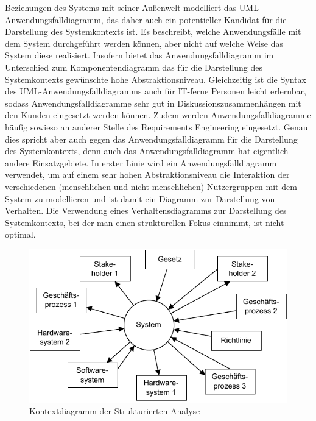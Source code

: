 Beziehungen des Systems mit seiner Außenwelt modelliert das UML-Anwen\-dungs\-fall\-diagramm, das daher auch ein potentieller Kandidat für die Darstellung des System\-kontexts ist.  Es beschreibt, welche Anwendungsfälle mit dem System durchgeführt werden können, aber nicht auf welche Weise das System diese realisiert. Insofern bietet das Anwendungsfalldiagramm im Unterschied zum Komponenten\-diagramm das für die Darstellung des Systemkontexts gewünschte hohe Abstraktions\-niveau. Gleichzeitig ist die Syntax des UML-Anwendungsfalldiagramms auch für 
\linebreak %
IT-ferne Personen leicht erlernbar, sodass Anwendungsfalldiagramme sehr gut in Diskussionszusammenhängen mit den Kunden eingesetzt werden können. Zudem werden Anwendungsfalldiagramme häufig sowieso an anderer Stelle des Requirements Engineering eingesetzt. Genau dies spricht aber auch gegen das Anwendungsfall\-diagramm für die Darstellung des Systemkontexts, denn auch das Anwendungsfalldiagramm hat eigentlich andere Einsatzgebiete. In erster Linie wird ein Anwendungs\-fall\-diagramm verwendet, um auf einem sehr hohen Abstraktionsniveau die Interaktion der verschiedenen (menschlichen und nicht-menschlichen) Nutzergruppen mit dem System zu modellieren und ist damit ein Diagramm zur Darstellung von Verhalten. Die Verwendung eines Verhaltensdiagramms zur Darstellung des System\-kontexts, bei der man einen strukturellen Fokus einnimmt, ist nicht optimal.

\begin{figure}[h!]
	\centering
	\includegraphics[scale=1.0]{Bilder/Kapitel-6/system.pdf}
	\caption{Kontextdiagramm der Strukturierten Analyse}
	\label{fig:kontextdiagramm_strukturierte_analyse}
\end{figure}

